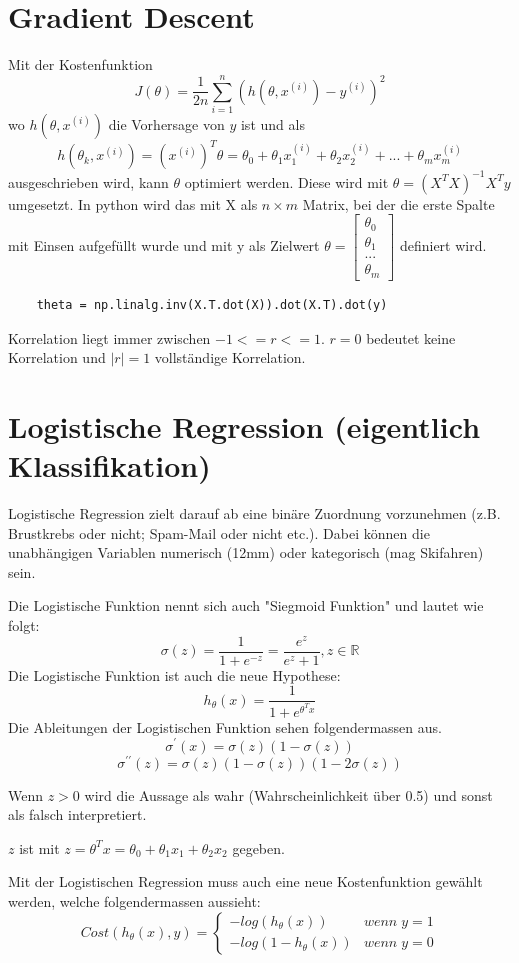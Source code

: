 \documentclass{article}
\begin{document}
\section{Gradient Descent}
	Mit der Kostenfunktion $$J(\theta) = \frac{1}{2 n} \sum_{i=1}^{n}(h(\theta,x^{(i)})-y^{(i)})^2$$ wo $h(\theta,x^{(i)})$ die Vorhersage von $y$ ist und als $$h(\theta_k,x^{(i)})= (x^{(i)})^T\theta=\theta_0+\theta_1x_1^{(i)}+\theta_2x_2^{(i)}+...+\theta_mx_m^{(i)}$$
	ausgeschrieben wird, kann $\theta$ optimiert werden.	
	Diese wird mit $\theta = (X^T X)^{-1} X^T y$ umgesetzt. 
	In python wird das mit X als $n \times m$ Matrix, bei der die erste Spalte mit Einsen aufgefüllt wurde und mit y als Zielwert
	$\theta = 
	\begin{bmatrix}
	\theta_0 \\[0.1pt] \theta_1 \\[0.1pt] ... \\[0.1pt] \theta_m
	\end{bmatrix}$ definiert wird.
	
	\begin{lstlisting}
	theta = np.linalg.inv(X.T.dot(X)).dot(X.T).dot(y)
	\end{lstlisting}
	
	Korrelation liegt immer zwischen $-1 <= r <= 1$.
	$r = 0$ bedeutet keine Korrelation und $|r| = 1$ vollständige Korrelation.
\section{Logistische Regression (eigentlich Klassifikation)}
	Logistische Regression zielt darauf ab eine binäre Zuordnung vorzunehmen (z.B. Brustkrebs oder nicht; Spam-Mail oder nicht etc.).
	Dabei können die unabhängigen Variablen numerisch (12mm) oder kategorisch (mag Skifahren) sein.
	
	Die Logistische Funktion nennt sich auch "Siegmoid Funktion" und lautet wie folgt:
	$$\sigma(z) = \frac{1}{1+e^{-z}} = \frac{e^z}{e^z+1}, z \in \mathbb{R}$$
	Die Logistische Funktion ist auch die neue Hypothese: $$h_\theta(x)=\frac{1}{1+e^{\theta^Tx}}$$
	Die Ableitungen der Logistischen Funktion sehen folgendermassen aus.
	$$\sigma^{\prime}(x) = \sigma(z) (1-\sigma(z))$$
	$$\sigma^{\prime\prime}(z)= \sigma(z)(1-\sigma(z))(1-2\sigma(z))$$
	
	Wenn $z > 0$ wird die Aussage als wahr (Wahrscheinlichkeit über 0.5) und sonst als falsch interpretiert.
	
	$z$ ist mit $z=\theta^T x = \theta_0 + \theta_1 x_1 + \theta_2 x_2$ gegeben.
	
	Mit der Logistischen Regression muss auch eine neue Kostenfunktion gewählt werden, welche folgendermassen aussieht:
	$$Cost(h_\theta(x), y) = \begin{cases}
	-log(h_\theta(x)) & wenn\;y = 1 \\
	-log(1-h_\theta(x)) & wenn\;y = 0
	\end{cases}$$
\end{document}
